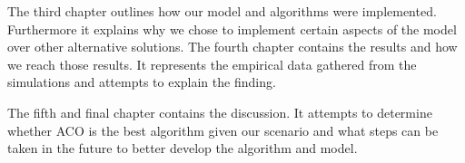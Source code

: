 The third chapter outlines how our model and algorithms were implemented. Furthermore it explains why we chose
to implement certain aspects of the model over other alternative solutions. The fourth chapter contains the results
and how we reach those results. It represents the empirical data gathered from the simulations and attempts to
explain the finding.

The fifth and final chapter contains the discussion. It attempts to determine whether ACO is the best algorithm given
our scenario and what steps can be taken in the future to better develop the algorithm and model.


